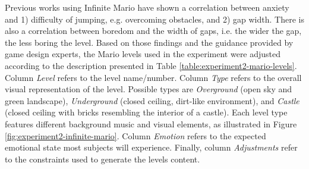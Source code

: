 Previous works using Infinite Mario \parencite{pedersen2009modeling,pedersen2010modeling} have shown a correlation between anxiety and 1) difficulty of jumping, e.g. overcoming obstacles, and 2) gap width. There is also a correlation between boredom and the width of gaps, i.e. the wider the gap, the less boring the level. Based on those findings and the guidance provided by game design experts, the Mario levels used in the experiment were adjusted according to the description presented in Table \ref{table:experiment2-mario-levels}. Column \textit{Level} refers to the level name/number. Column \textit{Type} refers to the overall visual representation of the level. Possible types are \textit{Overground} (open sky and green landscape), \textit{Underground} (closed ceiling, dirt-like environment), and \textit{Castle} (closed ceiling with bricks resembling the interior of a castle). Each level type features different background music and visual elements, as illustrated in Figure \ref{fig:experiment2-infinite-mario}. Column \textit{Emotion} refers to the expected emotional state most subjects will experience. Finally, column \textit{Adjustments} refer to the constraints used to generate the levels content.

